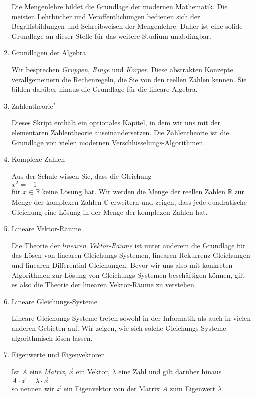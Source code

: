 \begin{enumerate}
      Die Mengenlehre bildet die Grundlage der modernen Mathematik.  Die meisten Lehrb\"{u}cher und
      Ver\"{o}ffentlichungen bedienen sich der Begriffsbildungen und Schreibweisen der Mengenlehre.
      Daher ist eine solide Grundlage an dieser Stelle f\"{u}r das weitere Studium unabdingbar.
\item Grundlagen der Algebra

      Wir besprechen \emph{Gruppen}, \emph{Ringe} und \emph{K\"{o}rper}.  Diese abstrakten Konzepte
      verallgemeinern  die Rechenregeln, die Sie von den reellen Zahlen kennen.  Sie bilden dar\"{u}ber
      hinaus die Grundlage f\"{u}r die lineare Algebra.
\item Zahlentheorie$^*$
  
      Dieses Skript enth\"{a}lt ein \underline{o}p\underline{tionales} Kapitel, in dem wir uns mit der 
      elementaren Zahlentheorie auseinandersetzen.  Die Zahlentheorie ist die Grundlage
      von vielen modernen Verschl\"{u}sselungs-Algorithmen.
\item Komplexe Zahlen

      Aus der Schule wissen Sie, dass die Gleichung
      \\[0.2cm]
      \hspace*{1.3cm}
      $x^2 = -1$
      \\[0.2cm]
      f\"{u}r $x \in \mathbb{R}$ keine L\"{o}sung hat.  Wir werden die Menge der reellen Zahlen $\mathbb{R}$
      zur Menge der komplexen Zahlen $\mathbb{C}$ erweitern und zeigen, dass jede quadratische
      Gleichung eine L\"{o}sung in der Menge der komplexen Zahlen hat.
\item Lineare Vektor-R\"{a}ume

      Die Theorie der \emph{linearen Vektor-R\"{a}ume} ist unter anderem die Grundlage f\"{u}r das L\"{o}sen von linearen
      Gleichungs-Systemen, linearen Rekurrenz-Gleichungen und linearen Differential-Gleichungen.
      Bevor wir uns also mit konkreten Algorithmen zur L\"{o}sung von Gleichungs-Systemen besch\"{a}ftigen
      k\"{o}nnen, gilt es also die Theorie der linearen Vektor-R\"{a}ume zu verstehen.
\item Lineare Gleichungs-Systeme

      Lineare Gleichungs-Systeme treten sowohl in der Informatik als auch in vielen anderen Gebieten auf. 
      Wir zeigen, wie sich solche Gleichungs-Systeme algorithmisch l\"{o}sen lassen.
\item Eigenwerte und Eigenvektoren

      Ist $A$ eine \emph{Matrix},  $\vec{x}$ ein Vektor, $\lambda$ eine Zahl und gilt dar\"{u}ber hinaus
      \\[0.2cm]
      \hspace*{1.3cm}
      $A \cdot \vec{x} = \lambda \cdot \vec{x}$
      \\[0.2cm]
      so nennen wir $\vec{x}$ ein Eigenvektor von der Matrix $A$ zum Eigenwert $\lambda$.
      

\end{enumerate}
